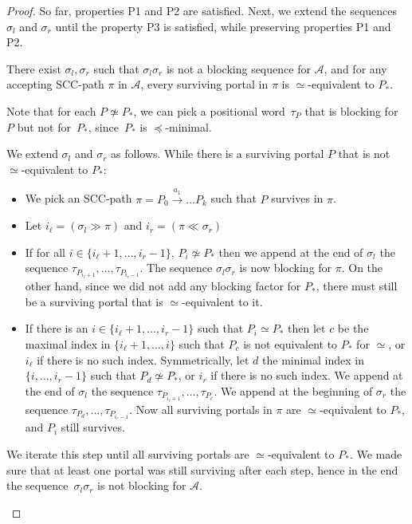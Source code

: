 \documentclass[letterpaper, USenglish, cleveref, autoref, thm-restate, numberwithinsect]{lipics-v2021}
\theoremstyle{theorem}
\theoremstyle{definition}
\newcommand{\Aa}{\mathcal{A}}
\newcommand{\equivportals}{\simeq}
\newcommand{\lefteffect}[2]{(#1 \gg #2)}
\newcommand{\leqportals}{\preceq}
\newcommand{\nequivportals}{\not\simeq}
\newcommand{\righteffect}[2]{(#2 \ll #1)}
\newcommand{\SCCpath}{\pi}
\newcommand{\set}[1]{\{ #1 \}}
\begin{document}
\begin{proof}
	So far, properties P1 and P2 are satisfied.
	Next, we extend the sequences $\sigma_l$ and $\sigma_r$ until the property P3 is satisfied, while preserving properties P1 and P2.

	\begin{claim}
		There exist $\sigma_l, \sigma_r$ such that
		$\sigma_l \sigma_r$ is not a blocking sequence for $\Aa$, and
		for any accepting SCC-path $\pi$ in $\Aa$, 
		every surviving portal in $\pi$ is $\equivportals$-equivalent to $P_*$.
	\end{claim}
	\begin{claimproof}
		Note that for each $P \nequivportals P_*$, we can pick a positional word~$\tau_{P}$ that is blocking for~$P$ but not for~$P_*$, since~$P_*$ is $\leqportals$-minimal.
		
		We extend $\sigma_l$ and $\sigma_r$ as follows.
		While there is a surviving portal $P$ that is not $\equivportals$-equivalent to $P_*$:
		\begin{itemize}
			\item We pick an SCC-path $\SCCpath = P_0 \xrightarrow{a_1}\ldots P_k$ such that $P$ survives in $\SCCpath$.
			
			\item Let $i_\ell = \lefteffect{\sigma_l}{\SCCpath}$ and $i_r = \righteffect{\sigma_r}{\SCCpath}$
			
			\item If for all $i \in \set{i_\ell+1,\ldots,i_r-1}$, $P_i \nequivportals P_*$ then we append at the end of $\sigma_l$ the sequence $\tau_{P_{i_\ell+1}}, \ldots, \tau_{P_{i_r-1}}$.
			The sequence $\sigma_l \sigma_r$ is now blocking for $\SCCpath$.
			On the other hand, since we did not add any blocking factor for $P_*$, there must still be a surviving portal that is $\equivportals$-equivalent to it.
			
			\item If there is an $i \in \set{i_\ell+1,\ldots,i_r-1}$ such that $P_i \equivportals P_*$ then let $c$ be the maximal index in $\set{i_\ell+1, \ldots, i}$ such that $P_c$ is not equivalent to $P_*$ for $\equivportals$, or $i_\ell$ if there is no such index. 
			Symmetrically, let $d$ the minimal index in $\set{i, \ldots, i_r-1}$ such that $P_d \nequivportals P_*$, or $i_r$ if there is no such index.
			We append at the end of $\sigma_l$ the sequence $\tau_{P_{i_\ell+1}}, \ldots, \tau_{P_{c}}$.
			We append at the beginning of $\sigma_r$ the sequence $\tau_{P_d}, \ldots, \tau_{P_{i_r-1}}$.
			Now all surviving portals in $\SCCpath$ are $\equivportals$-equivalent to $P_*$, and $P_i$ still survives.
		\end{itemize}
		
		We iterate this step until all surviving portals are $\equivportals$-equivalent to $P_*$.
		We made sure that at least one portal was still surviving after each step, hence in the end the sequence~$\sigma_l \sigma_r$ is not blocking for $\Aa$.
	\end{claimproof}
\end{proof}
\end{document}

